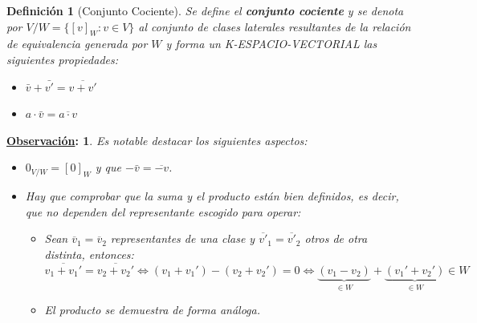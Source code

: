 \documentclass[10pt,a4paper,openright]{book}
\theoremstyle{break}
\newtheorem*{defi}{Definición}
\newtheorem*{obs}{\underline{Observación}:}
\begin{document}
\begin{defi}[Conjunto Cociente]
Se define el \textbf{conjunto cociente} y se denota por $V/W = \{[v]_W: v\in V\}$ al conjunto de clases laterales resultantes de la relación de equivalencia generada por $W$ y forma un K-ESPACIO-VECTORIAL las siguientes propiedades:
\begin{itemize}
\item $\bar{v}+\bar{v'}=\overline{v+v'}$
\item $a\cdot \bar{v}=\overline{a\cdot v}$
\end{itemize}
\end{defi}

\begin{obs}
Es notable destacar los siguientes aspectos:
\begin{itemize}
\item $0_{V/W}=[0]_W$ y que $-\bar{v}=\overline{-v}$.
\item Hay que comprobar que la suma y el producto están bien definidos, es decir, que no dependen del representante escogido para operar:
	\begin{itemize}
	\item Sean $\overline{v}_1=\overline{v}_2$ representantes de una clase y $\overline{v'}_1=\overline{v'}_2$ otros de otra distinta, entonces:
$$\overline{v_1+v_1'}=\overline{v_2+v_2'}\Leftrightarrow (v_1+v_1')-(v_2+v_2')=0\Leftrightarrow \underbrace{(v_1-v_2)}_{\in W}+\underbrace{(v_1'+v_2')}_{\in W}\in W$$
	\item El producto se demuestra de forma análoga.
	\end{itemize}
\end{itemize}
\end{obs}
\end{document}
